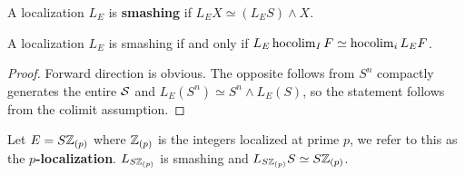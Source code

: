 \begin{definition}
    A localization $L_{E}$ is \textbf{smashing} if $L_E X\simeq (L_E S)\wedge X$.
\end{definition}

\begin{proposition}
    A localization $L_E$ is smashing if and only if $L_E \operatorname{hocolim}_I F\simeq \operatorname{hocolim}_i L_E F$.
\end{proposition}
\begin{proof}
    Forward direction is obvious. The opposite follows from $S^n$ compactly generates the entire $\operatorname{\mathcal{S}}$ and $L_E(S^n)\simeq S^n\wedge L_E(S)$, so the statement follows from the colimit assumption.
\end{proof}
\begin{proposition}
\end{proposition}
\begin{example}
    Let $E=S\mathbb{Z}_{(p)}$ where $\mathbb{Z}_{(p)}$ is the integers localized at prime $p$, we refer to this as the \textbf{$p$-localization}. $L_{S\mathbb{Z}_{(p)}}$ is smashing and $L_{S\mathbb{Z}_{(p)}}S \simeq S\mathbb{Z}_{(p)}$.
\end{example}
